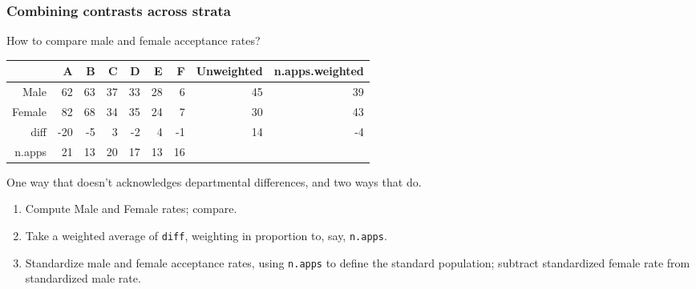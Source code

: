 \begin{frame}[fragile,label=SpafFr] 
\frametitle{Combining contrasts across strata}

How to compare male and female acceptance rates? 
\begin{tabular}{rrrrrrrrr}
  \hline
 & A & B & C & D & E & F & Unweighted & n.apps.weighted \\ 
  \hline
Male & 62 & 63 & 37 & 33 & 28 & 6 & 45 & 39 \\ 
  Female & 82 & 68 & 34 & 35 & 24 & 7 & 30 & 43 \\ 
  diff & -20 & -5 & 3 & -2 & 4 & -1 & 14 & -4 \\ 
  \hline n.apps & 21 & 13 & 20 & 17 & 13 & 16 &  &  \\ 
   \hline
\end{tabular}
\pause

One way that
doesn't acknowledges departmental differences, and two ways that do. 
\begin{enumerate}
 \item Compute Male and Female rates; compare. 
\item<2-> \label{item:4}Take a weighted average of \texttt{diff}, weighting in
  proportion to, say, \texttt{n.apps}.
\item<3-> \label{item:5}Standardize male and female acceptance rates, using \texttt{n.apps} to define the standard population; subtract standardized female rate from standardized male rate.
\end{enumerate}

\end{frame}

